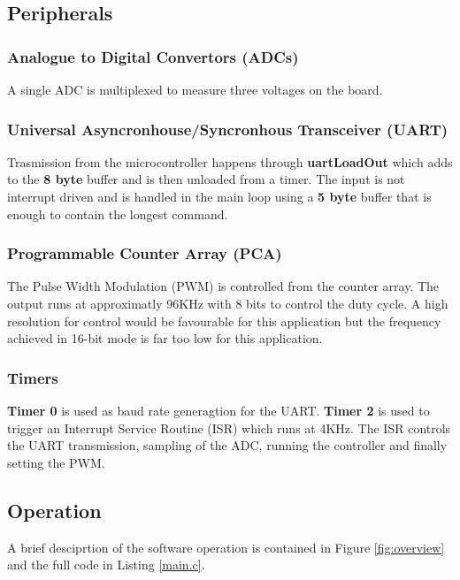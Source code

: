 \documentclass[12pt]{article}%
\begin{document}
\subsection{Peripherals}

\subsubsection{Analogue to Digital Convertors (ADCs)}

A single ADC is multiplexed to measure three voltages on the board. 

\subsubsection{Universal Asyncronhouse/Syncronhous Transceiver (UART)}

 Trasmission from the microcontroller happens through \textbf{uartLoadOut} which adds to the \textbf{8 byte} buffer and is then unloaded from a timer. The input is not interrupt driven and is handled in the main loop using a \textbf{5 byte} buffer that is enough to contain the longest command.

\subsubsection{Programmable Counter Array (PCA)}

The Pulse Width Modulation (PWM) is controlled from the counter array. The output runs at approximatly 96KHz with 8 bits to control the duty cycle. A high resolution for control would be favourable for this application but the frequency achieved in 16-bit mode is far too low for this application.

\subsubsection{Timers}

\textbf{Timer 0} is used as baud rate generagtion for the UART. \textbf{Timer 2} is used to trigger an Interrupt Service Routine (ISR) which runs at 4KHz. The ISR controls the UART transmission, sampling of the ADC, running the controller and finally setting the PWM.

\subsection{Operation}

A brief desciprtion of the software operation is contained in Figure \ref{fig:overview} and the full code in Listing \ref{main.c}.
\end{document}
